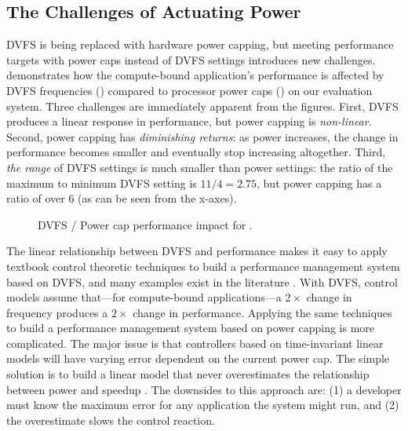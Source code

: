 \subsection{The Challenges of Actuating Power}
\label{sec:copper-motivation-power}

DVFS is being replaced with hardware power capping, but meeting performance targets with power caps instead of DVFS settings introduces new challenges.
 demonstrates how the compute-bound  application's performance is affected by DVFS frequencies () compared to processor power caps () on our evaluation system.
Three challenges are immediately apparent from the figures.
First, DVFS produces a linear response in performance, but power capping is \emph{non-linear}.
Second, power capping has \emph{diminishing returns}: as power increases, the change in performance becomes smaller and eventually stop increasing altogether.
Third, \emph{the range} of DVFS settings is much smaller than power settings: the ratio of the maximum to minimum DVFS setting is $11/4=2.75$, but power capping has a ratio of over 6 (as can be seen from the x-axes).

\begin{figure}[t]
  \centering
  \subfloat[DVFS]%
  {%
  \label{fig:copper-tradeoffs-vips-dvfs}}
  \caption{DVFS / Power cap performance impact for .}
  \label{fig:copper-tradeoffs-vips}
\end{figure}

The linear relationship between DVFS and performance makes it easy to apply textbook control theoretic techniques to build a performance management system based on DVFS, and many examples exist in the literature \cite{ICSE2014,SWiFT,KaramanolisEtAl-2005a,lefurgy2008power,josep-isca2016,GRAPE,ControlWare}.
With DVFS, control models assume that---for compute-bound applications---a $2\times$ change in frequency produces a $2\times$ change in performance.
Applying the same techniques to build a performance management system based on power capping is more complicated.
The major issue is that controllers based on time-invariant linear models will have varying error dependent on the current power cap.
The simple solution is to build a linear model that never overestimates the relationship between power and speedup \cite{ICSE2014}.
The downsides to this approach are: (1) a developer must know the maximum error for any application the system might run, and (2) the overestimate slows the control reaction.

